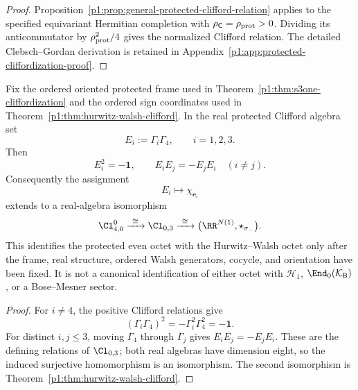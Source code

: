 \documentclass[11pt]{article}
\begin{document}
\begin{proof}
Proposition~\ref{p1:prop:general-protected-clifford-relation} applies to the
specified equivariant Hermitian completion with
\(\rho_{\mathsf C}=\rho_{\rm prot}>0\).  Dividing its anticommutator by
\(\rho_{\rm prot}^2/4\) gives the normalized Clifford relation.  The detailed
Clebsch--Gordan derivation is retained in
Appendix~\ref{p1:app:protected-cliffordization-proof}.
\end{proof}

\begin{proposition}
\label{p1:prop:s3one-even-clifford-sign-transport}
Fix the ordered oriented protected frame used in
Theorem~\ref{p1:thm:s3one-cliffordization} and the ordered sign coordinates
used in Theorem~\ref{p1:thm:hurwitz-walsh-clifford}.  In the real protected
Clifford algebra set
\[
    E_i:=\Gamma_i\Gamma_4,
    \qquad i=1,2,3.
\]
Then
\[
    E_i^2=-\mathbf1,
    \qquad
    E_iE_j=-E_jE_i\quad(i\ne j).
\]
Consequently the assignment
\[
    E_i\longmapsto\chi_{\mathbf e_i}
\]
extends to a real-algebra isomorphism
\[
    \Cl^0_{4,0}
    \xrightarrow{\ \cong\ }
    \Cl_{0,3}
    \xrightarrow{\ \cong\ }
    \bigl(\RR^{N(1)},\star_{\sigma_-}\bigr).
\]
This identifies the protected even octet with the Hurwitz--Walsh octet only
after the frame, real structure, ordered Walsh generators, cocycle, and
orientation have been fixed.  It is not a canonical identification of either
octet with \(\mathcal H_1\), \(\End_0(\mathcal K_{\mathsf B})\), or a
Bose--Mesner sector.
\end{proposition}

\begin{proof}
For \(i\ne4\), the positive Clifford relations give
\[
 (\Gamma_i\Gamma_4)^2
 =-\Gamma_i^2\Gamma_4^2=-\mathbf1.
\]
For distinct \(i,j\le3\), moving \(\Gamma_4\) through \(\Gamma_j\) gives
\(E_iE_j=-E_jE_i\).  These are the defining relations of
\(\Cl_{0,3}\); both real algebras have dimension eight, so the induced
surjective homomorphism is an isomorphism.  The second isomorphism is
Theorem~\ref{p1:thm:hurwitz-walsh-clifford}.
\end{proof}
\end{document}
